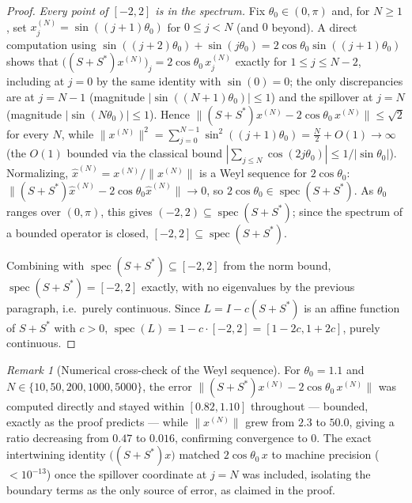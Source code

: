 \documentclass[11pt]{amsart}
\numberwithin{equation}{section}
\theoremstyle{plain}
\theoremstyle{definition}
\theoremstyle{remark}
\newtheorem{remark}[theorem]{Remark}
\begin{document}
\begin{proof}
\emph{Every point of \([-2,2]\) is in the spectrum.} Fix \(\theta_0\in(0,\pi)\) and, for \(N\ge1\), set \(x^{(N)}_j=\sin((j+1)\theta_0)\) for \(0\le j<N\) (and \(0\) beyond). A direct computation using \(\sin((j+2)\theta_0)+\sin(j\theta_0)=2\cos\theta_0\sin((j+1)\theta_0)\) shows that \(\bigl((S+S^*)x^{(N)}\bigr)_j=2\cos\theta_0\,x^{(N)}_j\) exactly for \(1\le j\le N-2\), including at \(j=0\) by the same identity with \(\sin(0)=0\); the only discrepancies are at \(j=N-1\) (magnitude \(|\sin((N+1)\theta_0)|\le1\)) and the spillover at \(j=N\) (magnitude \(|\sin(N\theta_0)|\le1\)). Hence \(\|(S+S^*)x^{(N)}-2\cos\theta_0\,x^{(N)}\|\le\sqrt2\) for every \(N\), while \(\|x^{(N)}\|^2=\sum_{j=0}^{N-1}\sin^2((j+1)\theta_0)=\tfrac N2+O(1)\to\infty\) (the \(O(1)\) bounded via the classical bound \(|\sum_{j\le N}\cos(2j\theta_0)|\le1/|\sin\theta_0|\)). Normalizing, \(\hat x^{(N)}=x^{(N)}/\|x^{(N)}\|\) is a Weyl sequence for \(2\cos\theta_0\): \(\|(S+S^*)\hat x^{(N)}-2\cos\theta_0\hat x^{(N)}\|\to0\), so \(2\cos\theta_0\in\operatorname{spec}(S+S^*)\). As \(\theta_0\) ranges over \((0,\pi)\), this gives \((-2,2)\subseteq\operatorname{spec}(S+S^*)\); since the spectrum of a bounded operator is closed, \([-2,2]\subseteq\operatorname{spec}(S+S^*)\).

Combining with \(\operatorname{spec}(S+S^*)\subseteq[-2,2]\) from the norm bound, \(\operatorname{spec}(S+S^*)=[-2,2]\) exactly, with no eigenvalues by the previous paragraph, i.e.\ purely continuous. Since \(L=I-c(S+S^*)\) is an affine function of \(S+S^*\) with \(c>0\), \(\operatorname{spec}(L)=1-c\cdot[-2,2]=[1-2c,1+2c]\), purely continuous.
\end{proof}

\begin{remark}[Numerical cross-check of the Weyl sequence]
\label{rem:weyl_numeric}
For \(\theta_0=1.1\) and \(N\in\{10,50,200,1000,5000\}\), the error \(\|(S+S^*)x^{(N)}-2\cos\theta_0\,x^{(N)}\|\) was computed directly and stayed within \([0.82,1.10]\) throughout — bounded, exactly as the proof predicts — while \(\|x^{(N)}\|\) grew from \(2.3\) to \(50.0\), giving a ratio decreasing from \(0.47\) to \(0.016\), confirming convergence to \(0\).  The exact intertwining identity \(\bigl((S+S^*)x\bigr)\) matched \(2\cos\theta_0\,x\) to machine precision (\(<10^{-13}\)) once the spillover coordinate at \(j=N\) was included, isolating the boundary terms as the only source of error, as claimed in the proof.
\end{remark}
\end{document}
